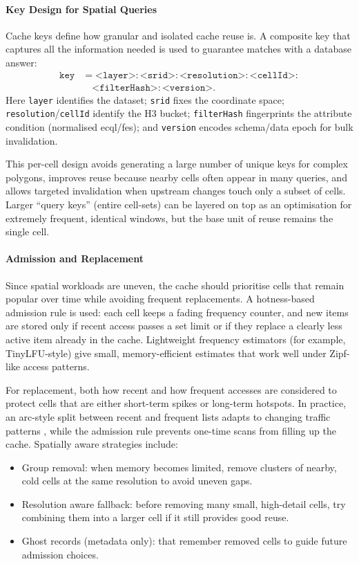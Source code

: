 \paragraph{Key Design for Spatial Queries}
Cache keys define how granular and isolated cache reuse is. A composite key that captures all the information needed is used to guarantee matches with a database answer:
\[
\begin{aligned}
\texttt{key} &=
\texttt{<layer>}:\texttt{<srid>}:\texttt{<resolution>}:\texttt{<cellId>}:\\
&\quad \texttt{<filterHash>}:\texttt{<version>}.
\end{aligned}
\]
Here \texttt{layer} identifies the dataset; \texttt{srid} fixes the coordinate space; \texttt{resolution}/\allowbreak\texttt{cellId} identify the H3 bucket; \texttt{filterHash} fingerprints the attribute condition (normalised \ac{ecql}/\ac{fes}); and \texttt{version} encodes schema/data epoch for bulk invalidation.

This per-cell design avoids generating a large number of unique keys for complex polygons, improves reuse because nearby cells often appear in many queries, and allows targeted invalidation when upstream changes touch only a subset of cells. Larger “query keys” (entire cell-sets) can be layered on top as an optimisation for extremely frequent, identical windows, but the base unit of reuse remains the single cell.

\paragraph{Admission and Replacement}
Since spatial workloads are uneven, the cache should prioritise cells that remain popular over time while avoiding frequent replacements. A hotness-based admission rule is used: each cell keeps a fading frequency counter, and new items are stored only if recent access passes a set limit or if they replace a clearly less active item already in the cache. Lightweight frequency estimators (for example, TinyLFU-style) give small, memory-efficient estimates that work well under Zipf-like access patterns.

For replacement, both how recent and how frequent accesses are considered to protect cells that are either short-term spikes or long-term hotspots. In practice, an \ac{arc}-style split between recent and frequent lists adapts to changing traffic patterns \cite{ARC}, while the admission rule prevents one-time scans from filling up the cache. Spatially aware strategies include:
\begin{itemize}
  \item Group removal: when memory becomes limited, remove clusters of nearby, cold cells at the same resolution to avoid uneven gaps.
  \item Resolution aware fallback: before removing many small, high-detail cells, try combining them into a larger cell if it still provides good reuse.
  \item Ghost records (metadata only): that remember removed cells to guide future admission choices.
\end{itemize}

